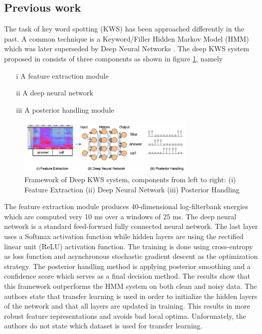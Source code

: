 \documentclass{article}
\theoremstyle{definition}
\theoremstyle{remark}
\begin{document}
\newpage





\subsection{Previous work}

The task of key word spotting (KWS) has been approached differently in the past. A common technique is a Keyword/Filler Hidden Markov Model (HMM) which was later superseded by Deep Neural Networks \cite{chen2014small}. The deep KWS system proposed in \cite{chen2014small} consists of three components as shown in figure \ref{fig:deep_kws_system_frameworkl}, namely

\begin{enumerate}
	\item[i] A feature extraction module
	\item[ii] A deep neural network
	\item[iii] A posterior handling module
\end{enumerate}

\begin{figure}[h]
    \centering
    \includegraphics[width=0.75\textwidth]{img/papers/cnns_for_keyword_spotting/deep_kws_system_framework.png}
    \caption{Framework of Deep KWS system, components from
left to right: (i) Feature Extraction (ii) Deep Neural Network
(iii) Posterior Handling}
    \label{fig:deep_kws_system_frameworkl}
\end{figure}

The feature extraction module produces 40-dimensional log-filterbank energies which are computed very 10 ms over a windows of 25 ms. The deep neural network is a standard feed-forward fully connected neural network. The last layer uses a Softmax activation function while hidden layers are using the rectified linear unit (ReLU) activation function. The training is done using cross-entropy as loss function and asynchronous stochastic gradient descent as the optimization strategy. The posterior handling method is applying posterior smoothing and a confidence score which serves as a final decision method. The results show that this framework outperforms the HMM system on both clean and noisy data. The authors state that transfer learning is used in order to initialize the hidden layers of the network and that all layers are updated in training. This results in more robust feature representations and avoids bad local optima. Unforunately, the authors do not state which dataset is used for transfer learning.\\
\end{document}
